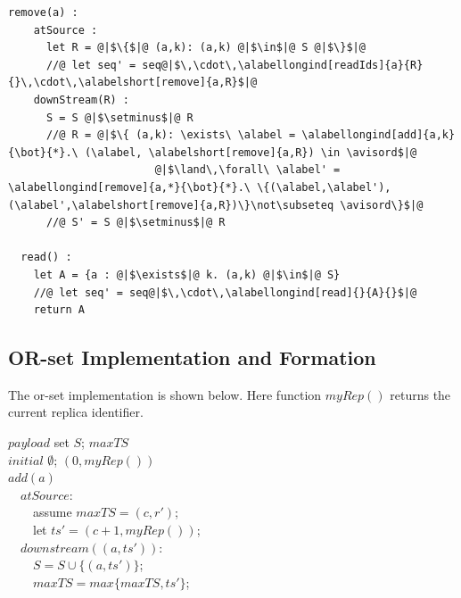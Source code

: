 {\begin{minipage}[t]{1.0\linewidth}
\begin{lstlisting}[frame=top,caption={Pseudo-code of the or-set CRDT},
captionpos=b,label={lst:operation-based multi-value register}]
  remove(a) :
    atSource :
      let R = @|$\{$|@ (a,k): (a,k) @|$\in$|@ S @|$\}$|@
      //@ let seq' = seq@|$\,\cdot\,\alabellongind[readIds]{a}{R}{}\,\cdot\,\alabelshort[remove]{a,R}$|@
    downStream(R) :
      S = S @|$\setminus$|@ R
      //@ R = @|$\{ (a,k): \exists\ \alabel = \alabellongind[add]{a,k}{\bot}{*}.\ (\alabel, \alabelshort[remove]{a,R}) \in \avisord$|@
                       @|$\land\,\forall\ \alabel' = \alabellongind[remove]{a,*}{\bot}{*}.\ \{(\alabel,\alabel'),(\alabel',\alabelshort[remove]{a,R})\}\not\subseteq \avisord\}$|@
      //@ S' = S @|$\setminus$|@ R

  read() :
    let A = {a : @|$\exists$|@ k. (a,k) @|$\in$|@ S}
    //@ let seq' = seq@|$\,\cdot\,\alabellongind[read]{}{A}{}$|@
    return A
\end{lstlisting}
\end{minipage}









\subsection{OR-set Implementation and Formation}
\label{subsec:or-set implementation and formation}

The or-set implementation is shown below. Here function $\mathit{myRep}()$ returns the current replica identifier.

\renewcommand{\algorithmcfname}{CRDT Implementation}
\noindent
\noindent\begin{algorithm}[H]
$\mathit{payload}$ set $S$; $\mathit{maxTS}$\\
$\mathit{initial}$ $\emptyset$; $(0,\mathit{myRep}())$\\

$add(a)$ \\
\ \ $\mathit{atSource}$: \\
\ \ \ \ assume $\mathit{maxTS} = (c,r')$; \\
\ \ \ \ let $\mathit{ts}' =(c+1,\mathit{myRep}())$; \\

\ \ $\mathit{downstream}((a,\mathit{ts}'))$: \\
\ \ \ \ $S = S \cup \{ (a,\mathit{ts}') \}$; \\
\ \ \ \ $\mathit{maxTS} = \mathit{max} \{ \mathit{maxTS},\mathit{ts}' \}$;



\end{algorithm}}
